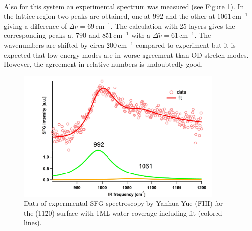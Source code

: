 \documentclass[11pt,DIV=13,BCOR=5mm,a4paper,headinclude]{scrbook}
\begin{document}
\\
Also for this system an experimental spectrum was measured (see Figure \ref{abb:exp-sfg_fully}).
In the lattice region two peaks are obtained, one at $992$ and the other at $1061\,$cm$^{-1}$ giving a difference of $\Delta \tilde{\nu}=69\,$cm$^{-1}$.
The calculation with 25 layers gives the corresponding peaks at $790$ and $851\,$cm$^{-1}$ %
with a $\Delta \tilde{\nu}=61\,$cm$^{-1}$.
The wavenumbers are shifted by circa $200\,$cm$^{-1}$ compared to experiment but it is expected that low energy modes are in worse agreement than OD stretch modes.
However, the agreement in relative numbers is undoubtedly good.
\begin{figure}[!h]
 \centering
\includegraphics[width=0.9\textwidth]{figures/11-20/ssp_UHV_200K_fit_hydrox.jpg}
 \caption{Data of experimental SFG spectroscopy by Yanhua Yue (FHI) for the (11\=20) surface with 1ML water coverage including fit (colored lines).}
        \label{abb:exp-sfg_fully}
 \end{figure}
\\\\
\end{document}
